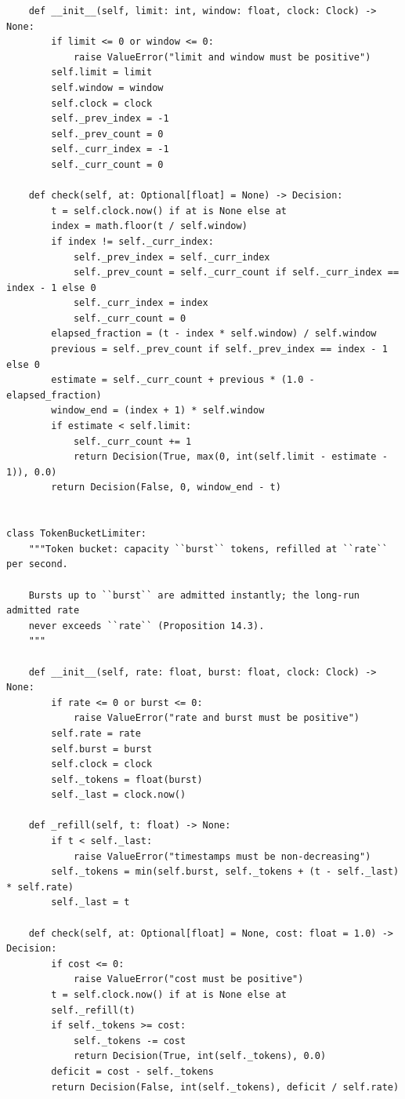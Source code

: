 \begin{verbatim}
    def __init__(self, limit: int, window: float, clock: Clock) -> None:
        if limit <= 0 or window <= 0:
            raise ValueError("limit and window must be positive")
        self.limit = limit
        self.window = window
        self.clock = clock
        self._prev_index = -1
        self._prev_count = 0
        self._curr_index = -1
        self._curr_count = 0

    def check(self, at: Optional[float] = None) -> Decision:
        t = self.clock.now() if at is None else at
        index = math.floor(t / self.window)
        if index != self._curr_index:
            self._prev_index = self._curr_index
            self._prev_count = self._curr_count if self._curr_index == index - 1 else 0
            self._curr_index = index
            self._curr_count = 0
        elapsed_fraction = (t - index * self.window) / self.window
        previous = self._prev_count if self._prev_index == index - 1 else 0
        estimate = self._curr_count + previous * (1.0 - elapsed_fraction)
        window_end = (index + 1) * self.window
        if estimate < self.limit:
            self._curr_count += 1
            return Decision(True, max(0, int(self.limit - estimate - 1)), 0.0)
        return Decision(False, 0, window_end - t)


class TokenBucketLimiter:
    """Token bucket: capacity ``burst`` tokens, refilled at ``rate`` per second.

    Bursts up to ``burst`` are admitted instantly; the long-run admitted rate
    never exceeds ``rate`` (Proposition 14.3).
    """

    def __init__(self, rate: float, burst: float, clock: Clock) -> None:
        if rate <= 0 or burst <= 0:
            raise ValueError("rate and burst must be positive")
        self.rate = rate
        self.burst = burst
        self.clock = clock
        self._tokens = float(burst)
        self._last = clock.now()

    def _refill(self, t: float) -> None:
        if t < self._last:
            raise ValueError("timestamps must be non-decreasing")
        self._tokens = min(self.burst, self._tokens + (t - self._last) * self.rate)
        self._last = t

    def check(self, at: Optional[float] = None, cost: float = 1.0) -> Decision:
        if cost <= 0:
            raise ValueError("cost must be positive")
        t = self.clock.now() if at is None else at
        self._refill(t)
        if self._tokens >= cost:
            self._tokens -= cost
            return Decision(True, int(self._tokens), 0.0)
        deficit = cost - self._tokens
        return Decision(False, int(self._tokens), deficit / self.rate)



\end{verbatim}
